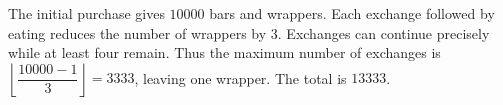 The initial purchase gives $10000$ bars and wrappers. Each exchange followed by eating reduces the number of wrappers by $3$. Exchanges can continue precisely while at least four remain. Thus the maximum number of exchanges is $\left\lfloor\dfrac{10000-1}{3}\right\rfloor=3333$, leaving one wrapper. The total is $\boxed{13333}$.
